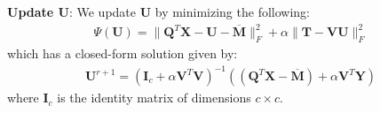 \noindent\textbf{Update $\bm{U}$}: We update $\bm{U}$ by minimizing the following:
\begin{align}
    \label{eq: TRLSR_Update_U}
   \Psi (\bm{U}) =  \| \bm{Q}^{T}\bm{X} - \bm{U} - \overline{\bm{M}} \|_{F}^{2} + \alpha \| \bm{T} - \bm{V} \bm{U} \|_{F}^{2}
\end{align}
which has a closed-form solution given by:
%
\begin{align}
    \label{eq: TRLSR_Define_U}
    \bm{U}^{r+1} = \left(\bm{I}_{c} + \alpha \bm{V}^{T} \bm{V}\right)^{-1} \left( (\bm{Q}^{T} \bm{X} - \overline{\bm{M}} ) +  \alpha \bm{V}^{T} \bm{Y} \right)
\end{align}
%
where $\bm{I}_{c}$ is the identity matrix of dimensions $c\times c$.  

